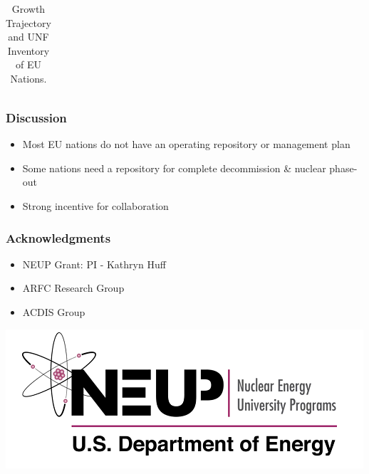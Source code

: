 \begin{frame}
\begin{table}[h]
\begin{adjustbox}{max totalsize={1.1\textwidth}{.8\textheight}, center}
\begin{tabularx}{\textwidth}{lbb}
                \end{tabularx}
    \end{adjustbox}
    \caption {Growth Trajectory and UNF Inventory of \gls{EU} Nations.}
    \label{tab:which_count}
\end{table}
\end{frame}


\begin{frame}
	\frametitle{Discussion}
	\begin{itemize}
		\item Most EU nations do not have an operating repository or management plan
		\item Some nations need a repository for complete decommission \& nuclear phase-out	
		\item Strong incentive for collaboration
	\end{itemize}
\end{frame}

\begin{frame}
    \frametitle{Acknowledgments}
    \begin{itemize}
        \item NEUP Grant: PI - Kathryn Huff
        \item \gls{ARFC} Research Group
        \item \gls{ACDIS} Group
    \end{itemize}
    \begin{center}
        \includegraphics[width=\textwidth]{./images/neup.png}
    \end{center}
\end{frame}